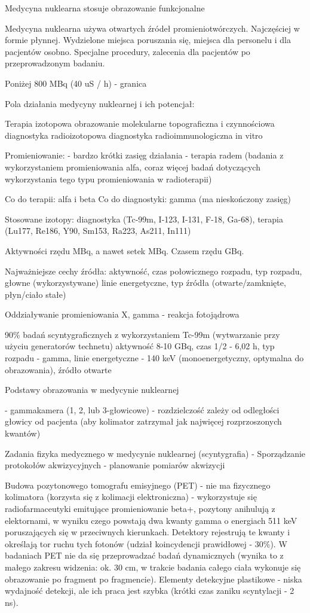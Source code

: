 \documentclass{article}
\begin{document}
Medycyna nuklearna stosuje obrazowanie funkcjonalne

Medycyna nuklearna używa otwartych źródeł promieniotwórczych. Najczęściej w formie płynnej. Wydzielone miejsca poruszania się, miejsca dla personelu i dla pacjentów osobno. Specjalne procedury, zalecenia dla pacjentów po przeprowadzonym badaniu. 

Poniżej 800 MBq (40 uS / h) - granica

Pola działania medycyny nuklearnej i ich potencjał:

Terapia izotopowa
obrazowanie molekularne
topograficzna i czynnościowa diagnostyka radioizotopowa
diagnostyka radioimmunologiczna in vitro

Promieniowanie:
- bardzo krótki zasięg działania
- terapia radem (badania z wykorzystaniem promieniowania alfa, coraz więcej badań dotyczących wykorzystania tego typu promieniowania w radioterapii)

Co do terapii: alfa i beta
Co do diagnostyki: gamma (ma nieskończony zasięg)

Stosowane izotopy: diagnostyka (Tc-99m, I-123, I-131, F-18, Ga-68), terapia (Lu177, Re186, Y90, Sm153, Ra223, As211, In111)

Aktywności rzędu MBq, a nawet setek MBq. Czasem rzędu GBq.

Najważniejsze cechy źródła: aktywność, czas połowicznego rozpadu, typ rozpadu, głowne (wykorzystywane) linie energetyczne, typ źródła (otwarte/zamknięte, płyn/ciało stałe)

Oddziaływanie promieniowania X, gamma - reakcja fotojądrowa

90\% badań scyntygraficznych z wykorzystaniem Tc-99m (wytwarzanie przy użyciu generatorów technetu)  aktywność 8-10 GBq, czas 1/2 - 6,02 h, typ rozpadu - gamma, linie energetyczne - 140 keV (monoenergetyczny, optymalna do obrazowania), źródło otwarte

Podstawy obrazowania w medycynie nuklearnej

- gammakamera (1, 2, lub 3-głowicowe) - rozdzielczość zależy od odległości głowicy od pacjenta (aby kolimator zatrzymał jak najwięcej rozprzoszonych kwantów)

Zadania fizyka medycznego w medycynie nuklearnej (scyntygrafia)
- Sporządzanie protokołów akwizycyjnych
- planowanie pomiarów akwizycji

Budowa pozytonowego tomografu emisyjnego (PET) - nie ma fizycznego kolimatora (korzysta się z kolimacji elektroniczna) - wykorzystuje się radiofarmaceutyki emitujące promieniowanie beta+, pozytony anihulują z elektornami, w wyniku czego powstają dwa kwanty gamma o energiach 511 keV poruszających się w przeciwnych kierunkach. Detektory rejestrują te kwanty i określają tor ruchu tych fotonów (udział koincydencji prawidłowej - 30\%). W badaniach PET nie da się przeprowadzać badań dynamicznych (wynika to z małego zakresu widzenia: ok. 30 cm, w trakcie badania całego ciała wykonuje się obrazowanie po fragment po fragmencie). Elementy detekcyjne plastikowe - niska wydajność detekcji, ale ich praca jest szybka (krótki czas zaniku scyntylacji - 2 ns).
\end{document}
